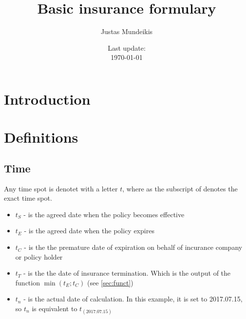 \documentclass[11pt,a4paper,fleqn]{article}      %
\begin{document}
\begin{titlepage}
\title{Basic insurance formulary}
\author{Justas Mundeikis}
\date{Last update:\\ \today}
\maketitle
\thispagestyle{empty}
\vspace{0.5cm}


\end{titlepage}
\clearpage

 
 
\tableofcontents
 
\newpage
\section{Introduction}


\section{Definitions}

\subsection{Time}
Any time spot is denotet with a letter $t$, where as the subscript of denotes the exact time spot. 
\begin{itemize}
\item $t_{S}$ - is the agreed date when the policy becomes effective
\item $t_{E}$ - is the agreed date when the policy expires
\item $t_{C}$ - is the the premature date of expiration on behalf of incurance company or policy holder
\item $t_{T}$ - is the the date of insurance termination. Which is the output of the function $\min(t_E; t_C)$ (see \ref{sec:funct})
\item $t_{n}$ - is the actual date of calculation. In this example, it is set to 2017.07.15, so $t_n$ is equivalent to $t_{(2017.07.15)}$
\end{itemize}
\end{document}
